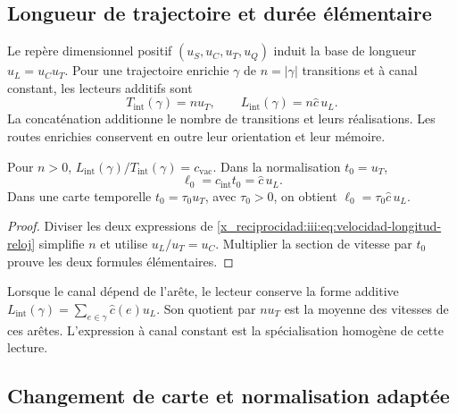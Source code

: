 \subsection{Longueur de trajectoire et durée élémentaire}

Le repère dimensionnel positif $(u_S,u_C,u_T,u_Q)$ induit la base de longueur $u_L=u_Cu_T$. Pour une trajectoire enrichie $\gamma$ de $n=|\gamma|$ transitions et à canal constant, les lecteurs additifs sont
\begin{equation}
 T_{\mathrm{int}}(\gamma)=nu_T,
 \qquad L_{\mathrm{int}}(\gamma)=n\widehat c\,u_L.
 \label{x_reciprocidad:iii:eq:velocidad-longitud-reloj}
\end{equation}
La concaténation additionne le nombre de transitions et leurs réalisations.
Les routes enrichies conservent en outre leur orientation et leur mémoire.

\begin{corollary}
Pour $n>0$, $L_{\mathrm{int}}(\gamma)/T_{\mathrm{int}}(\gamma)
=c_{\mathrm{vac}}$. Dans la normalisation $t_0=u_T$,
\begin{equation}
 \ell_0=c_{\mathrm{int}}t_0=\widehat c\,u_L.
 \label{x_reciprocidad:iii:eq:longitud-elemental-constitutiva}
\end{equation}
Dans une carte temporelle $t_0=\tau_0u_T$, avec $\tau_0>0$, on obtient
$\ell_0=\tau_0\widehat c\,u_L$.
\end{corollary}
\begin{proof}
Diviser les deux expressions de \eqref{x_reciprocidad:iii:eq:velocidad-longitud-reloj} simplifie $n$ et utilise $u_L/u_T=u_C$. Multiplier la section de vitesse par $t_0$ prouve les deux formules élémentaires.
\end{proof}

Lorsque le canal dépend de l’arête, le lecteur conserve la forme additive
$L_{\mathrm{int}}(\gamma)=\sum_{e\in\gamma}\widehat c(e)u_L$.
Son quotient par $nu_T$ est la moyenne des vitesses de ces arêtes.
L’expression à canal constant est la spécialisation homogène de
cette lecture.

\subsection{Changement de carte et normalisation adaptée}

